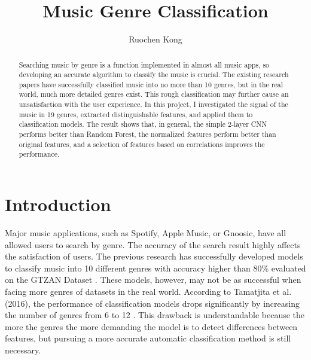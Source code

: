 \documentclass[sigconf ,nonacm]{acmart}
\begin{document}
\title{Music Genre Classification}

\author{Ruochen Kong}

\begin{abstract}
Searching music by genre is a function implemented in almost all music apps, so developing an accurate algorithm to classify the music is crucial. The existing research papers have successfully classified music into no more than 10 genres, but in the real world, much more detailed genres exist. This rough classification may further cause an unsatisfaction with the user experience. In this project, I investigated the signal of the music in 19 genres, extracted distinguishable features, and applied them to classification models. The result shows that, in general, the simple 2-layer CNN performs better than Random Forest, the normalized features perform better than original features, and a selection of features based on correlations improves the performance. 
\end{abstract}

\maketitle

\section{Introduction}
Major music applications, such as Spotify, Apple Music, or Gnoosic, have all allowed users to search by genre. The accuracy of the search result highly affects the satisfaction of users. The previous research has successfully developed models to classify music into 10 different genres with accuracy higher than 80\% evaluated on the GTZAN Dataset \cite{panagakis2009music,lee2009automatic,sigtia2014improved,fu2010survey}. These models, however, may not be as successful when facing more genres of datasets in the real world. According to Tamatjita et al. (2016), the performance of classification models drops significantly by increasing the number of genres from 6 to 12 \cite{comparison}. This drawback is understandable because the more the genres the more demanding the model is to detect differences between features, but pursuing a more accurate automatic classification method is still necessary. 
\end{document}
